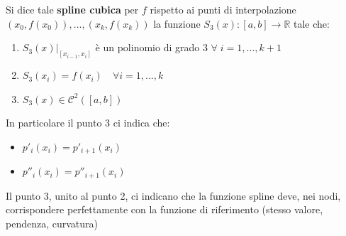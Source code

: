 \documentclass[12pt,a4paper,]{report}
\begin{document}
\begin{definizione}
    Si dice tale \textbf{spline cubica} per $f$ rispetto ai punti di interpolazione $(x_0, f(x_0)), \dots , (x_k, f(x_k))$ la funzione $S_3(x) : [a,b] \rightarrow \mathbb{R}$ tale che:
    \begin{enumerate}
        \item $S_3(x)|_{[x_{i-1},x_i]}$ è un polinomio di grado 3 $\forall \;i = 1, \dots, k+1$
        \item $S_3(x_i) = f(x_i) \quad \forall i = 1,...,k$
        \item $S_3(x) \in \mathcal{C}^2([a,b])$
    \end{enumerate}
    In particolare il punto 3 ci indica che:
    \begin{itemize}
        \item $p'_i (x_i) = p'_{i+1}(x_i)$
        \item $p''_i (x_i) = p''_{i+1}(x_i)$
    \end{itemize}
    \begin{nota}
        Il punto 3, unito al punto 2, ci indicano che la funzione spline deve, nei nodi, corrispondere perfettamente con la funzione di riferimento (stesso valore, pendenza, curvatura)
    \end{nota}
\end{definizione}
\end{document}
